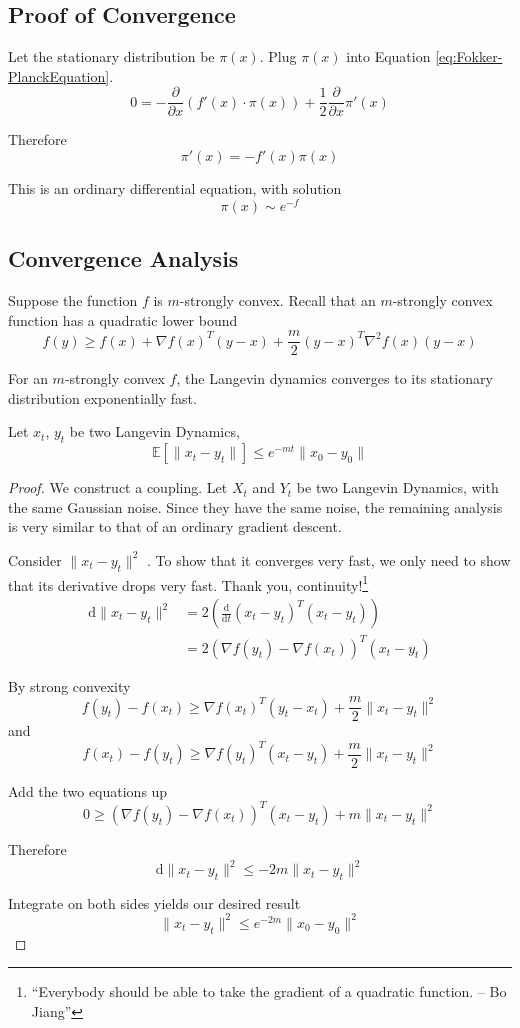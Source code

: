     \subsection{Proof of Convergence}
        Let the stationary distribution be $\pi(x)$. Plug $\pi(x)$ into Equation \ref{eq:Fokker-PlanckEquation}.
        \[ 0 = -\frac{\partial}{\partial x}\left( f'(x) \cdot \pi(x) \right) + \frac{1}{2}\frac{\partial}{\partial x}\pi'(x)\]

        Therefore
        \[ \pi'(x) = -f'(x)\pi(x) \]

        This is an ordinary differential equation, with solution
        \[ \pi(x) \sim e^{-f} \]

    \subsection{Convergence Analysis}
        Suppose the function $f$ is $m$-strongly convex. Recall that an $m$-strongly convex function has a quadratic lower bound
        \[ f(y) \ge f(x) + \nabla f(x)^T(y-x) + \frac{m}{2}(y-x)^T\nabla^2f(x)(y-x) \]

        \begin{theorem}
            For an $m$-strongly convex $f$, the Langevin dynamics converges to its stationary distribution exponentially fast.

            Let $x_t$, $y_t$ be two Langevin Dynamics,
            \[ \mathbb{E}[\|x_t-y_t\|] \le e^{-mt}\|x_0-y_0\| \]
        \end{theorem}
        \begin{proof}
            We construct a coupling. Let $X_t$ and $Y_t$ be two Langevin Dynamics, with the same Gaussian noise. Since they have the same noise, the remaining analysis is very similar to that of an ordinary gradient descent.

            Consider $\|x_t-y_t\|^2$ . To show that it converges very fast, we only need to show that its derivative drops very fast. Thank you, continuity!\footnote{``Everybody should be able to take the gradient of a quadratic function. -- Bo Jiang''}
            \begin{align*}
                \mathrm{d}\|x_t-y_t\|^2 &= 2\left(\frac{\mathrm{d}}{\mathrm{d}t}(x_t-y_t)^T(x_t-y_t)\right)\\
                &= 2(\nabla f(y_t) - \nabla f(x_t))^T(x_t-y_t)
            \end{align*}

            By strong convexity
            \[ f(y_t) - f(x_t) \ge \nabla f(x_t)^T(y_t-x_t) + \frac{m}{2}\|x_t-y_t\|^2 \]
            and
            \[ f(x_t) - f(y_t) \ge \nabla f(y_t)^T(x_t-y_t) + \frac{m}{2}\|x_t-y_t\|^2 \]

            Add the two equations up
            \[ 0 \ge (\nabla f(y_t) - \nabla f(x_t))^T(x_t-y_t) + m\|x_t-y_t\|^2 \]

            Therefore
            \[ \mathrm{d}\|x_t-y_t\|^2 \le -2m\|x_t-y_t\|^2 \]

            Integrate on both sides yields our desired result
            \[ \|x_t-y_t\|^2 \le e^{-2m}\|x_0-y_0\|^2 \]
        \end{proof}

